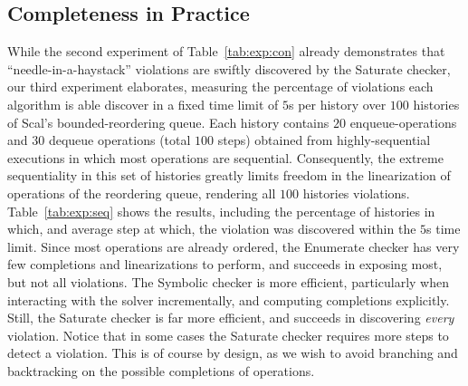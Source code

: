 \subsection{Completeness in Practice}
\label{sec:exp:complete}

While the second experiment of Table~\ref{tab:exp:con} already demonstrates
that ``needle-in-a-haystack'' violations are swiftly discovered by the {\sc
Saturate} checker, our third experiment elaborates, measuring the percentage of
violations each algorithm is able discover in a fixed time limit of $5$s per
history over $100$ histories of Scal's bounded-reordering queue. Each history
contains $20$ {\sf enqueue}-operations and $30$ {\sf dequeue} operations (total
$100$ steps) obtained from highly-sequential executions in which most
operations are sequential. Consequently, the extreme sequentiality in this set
of histories greatly limits freedom in the linearization of operations of the
reordering queue, rendering all $100$ histories violations.
Table~\ref{tab:exp:seq} shows the results, including the percentage of
histories in which, and average step at which, the violation was discovered
within the $5$s time limit. Since most operations are already ordered, the {\sc
Enumerate} checker has very few completions and linearizations to perform, and
succeeds in exposing most, but not all violations. The {\sc Symbolic} checker
is more efficient, particularly when interacting with the solver incrementally,
and computing completions explicitly. Still, the {\sc Saturate} checker is far
more efficient, and succeeds in discovering \emph{every} violation. Notice that
in some cases the {\sc Saturate} checker requires more steps to detect a
violation. This is of course by design, as we wish to avoid branching and
backtracking on the possible completions of operations.

